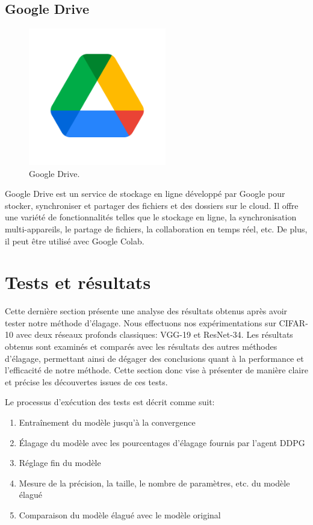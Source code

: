 \subsection{Google Drive}

\begin{figure}[hbt!]
  \centering
  \includegraphics[width=6cm]{images_pfe/drive.png}
  \caption{Google Drive.}
  \label{fig:drive}
\end{figure}
\FloatBarrier
\medskip

Google Drive est un service de stockage en ligne développé par Google pour stocker, synchroniser et partager des fichiers et des dossiers sur le cloud. Il offre une variété de fonctionnalités telles que le stockage en ligne, la synchronisation multi-appareils, le partage de fichiers, la collaboration en temps réel, etc. De plus, il peut être utilisé avec Google Colab.

\section{Tests et résultats}
Cette dernière section présente une analyse des résultats obtenus après avoir tester notre méthode d'élagage. Nous effectuons nos expérimentations sur CIFAR-10 avec deux réseaux profonds classiques: VGG-19 et ResNet-34. Les résultats obtenus sont examinés et comparés avec les résultats des autres méthodes d'élagage, permettant ainsi de dégager des conclusions quant à la performance et l'efficacité de notre méthode. Cette section donc vise à présenter de manière claire et précise les découvertes issues de ces tests.

Le processus d'exécution des tests est décrit comme suit:
\begin{enumerate}
    \item Entraînement du modèle jusqu'à la convergence
    \item Élagage du modèle avec les pourcentages d'élagage fournis par l'agent DDPG
    \item Réglage fin du modèle
    \item Mesure de la précision, la taille, le nombre de paramètres, etc. du modèle élagué
    \item Comparaison du modèle élagué avec le modèle original
\end{enumerate}

